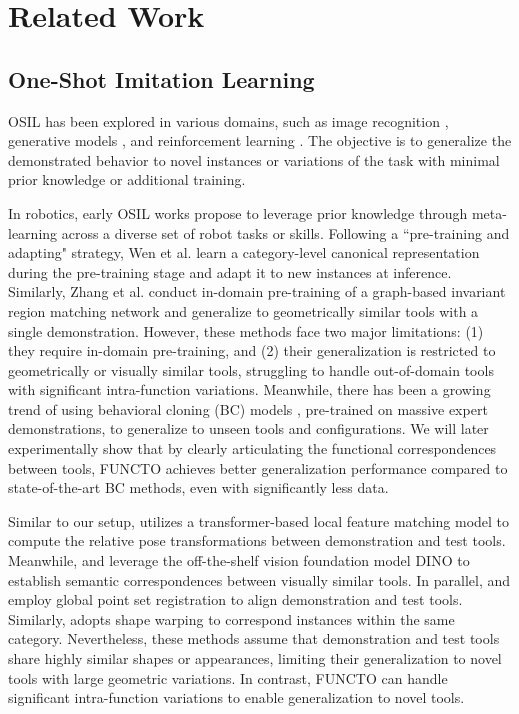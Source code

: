 \section{Related Work}

\subsection{One-Shot Imitation Learning}
OSIL has been explored in various domains, such as image recognition \cite{vinyals2016matching, santoro2016meta}, generative models \cite{edwards2017towards}, and reinforcement learning \cite{duan2016rl}. The objective is to generalize the demonstrated behavior to novel instances or variations of the task with minimal prior knowledge or additional training.

In robotics, early OSIL works \cite{finn2017one, duan2017one, yu2018one} propose to leverage prior knowledge through meta-learning across a diverse set of robot tasks or skills. Following a ``pre-training and adapting" strategy, Wen et al. \cite{wen2022you, wen2022catgrasp} learn a category-level canonical representation during the pre-training stage and adapt it to new instances at inference. Similarly, Zhang et al. \cite{zhang2024one} conduct in-domain pre-training of a graph-based invariant region matching network and generalize to geometrically similar tools with a single demonstration. However, these methods face two major limitations: (1) they require in-domain pre-training, and (2) their generalization is restricted to geometrically or visually similar tools, struggling to handle out-of-domain tools with significant intra-function variations. Meanwhile, there has been a growing trend of using behavioral cloning (BC) models \cite{chi2023diffusion, zhao2023learning, ze20243d}, pre-trained on massive expert demonstrations, to generalize to unseen tools and configurations. We will later experimentally show that by clearly articulating the functional correspondences between tools, FUNCTO achieves better generalization performance compared to state-of-the-art BC methods, even with significantly less data.

Similar to our setup, \cite{heppert2024ditto} utilizes a transformer-based local feature matching model to compute the relative pose transformations between demonstration and test tools. Meanwhile, \cite{vitiello2023one} and \cite{di2024dinobot} leverage the off-the-shelf vision foundation model DINO \cite{oquabdinov2} to establish semantic correspondences between visually similar tools. In parallel, \cite{zhu2024vision} and \cite{li2024okami} employ global point set registration \cite{choi2015robust} to align demonstration and test tools. Similarly,  \cite{biza2023one} adopts shape warping \cite{rodriguez2018transferring} to correspond instances within the same category. Nevertheless, these methods assume that demonstration and test tools share highly similar shapes or appearances, limiting their generalization to novel tools with large geometric variations. In contrast, FUNCTO can handle significant intra-function variations to enable generalization to novel tools.

